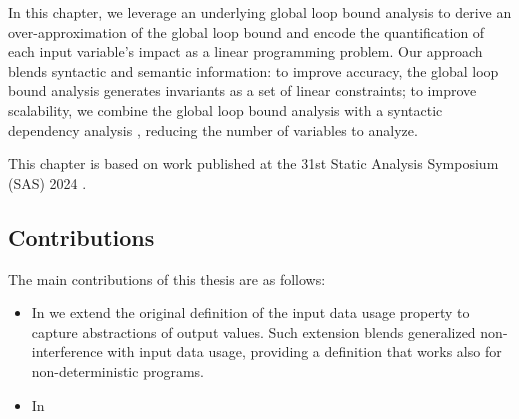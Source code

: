 In this chapter, we leverage an underlying global loop bound analysis to derive an over-approximation of the global loop bound and encode the quantification of each input variable's impact as a linear programming problem.
Our approach blends syntactic and semantic information:
to improve accuracy, the global loop bound analysis generates invariants as a set of linear constraints;
to improve scalability, we combine the global loop bound analysis with a syntactic dependency analysis , reducing the number of variables to analyze.

This chapter is based on work published at the 31st Static Analysis Symposium (SAS) 2024 .

\subsection{Contributions}

The main contributions of this thesis are as follows:
\begin{itemize}
  \item In  we extend the original definition of the input data usage property to capture abstractions of output values.
  Such extension blends generalized non-interference with input data usage, providing a definition that works also for non-deterministic programs.
  \item In 
\end{itemize}
